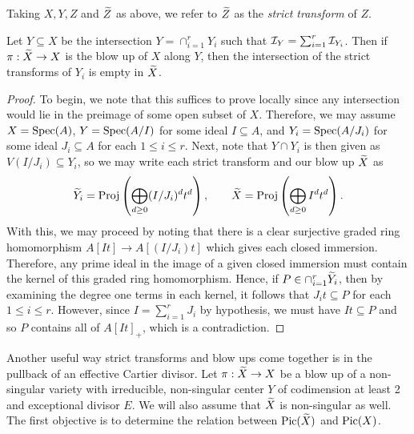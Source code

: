 \begin{definition}
    Taking $X, Y, Z$ and $\widetilde Z$ as above, we refer to  $\widetilde Z$ as the \textit{strict transform} of $Z$.
\end{definition}

\begin{proposition}
    Let $Y \subseteq X$ be the intersection $Y = \cap_{i = 1}^r Y_i$ such that $\mathcal{I}_Y = \sum_{i = 1}^r \mathcal{I}_{Y_i}$.
    Then if $\pi: \widetilde X \to X$ is the blow up of $X$ along $Y$,
    then the intersection of the strict transforms of $Y_i$ is empty in $\widetilde X$.
\end{proposition}

\begin{proof}
    To begin, we note that this suffices to prove locally since any intersection would lie in the preimage of some open subset of $X$.
    Therefore, we may assume $X = {\rm Spec}(A)$, $Y = {\rm Spec}(A / I)$ for some ideal $I \subseteq A$, and $Y_i = {\rm Spec}(A / J_i)$ for some ideal $J_i \subseteq A$ for each $1 \leq i \leq r$.
    Next, note that $Y \cap Y_i$ is then given as $V(I/J_i) \subseteq Y_i$,
    so we may write each strict transform and our blow up $\widetilde X$ as
    \[
        \widetilde Y_i = {\rm Proj}\left(
            \bigoplus_{d \geq 0} (I/J_i)^d t^d
        \right), \qquad
        \widetilde X = {\rm Proj}\left(
            \bigoplus_{d \geq 0} I^d t^d
        \right).
    \]
    With this, we may proceed by noting that there is a clear surjective graded ring homomorphism $A[It] \to A[(I/J_i) t]$ which gives each closed immersion.
    Therefore, any prime ideal in the image of a given closed immersion must contain the kernel of this graded ring homomorphism.
    Hence, if $P \in \cap_{i = 1}^r \widetilde Y_i$,
    then by examining the degree one terms in each kernel,
    it follows that $J_i t \subseteq P$ for each $1 \leq i \leq r$.
    However, since $I = \sum_{i = 1}^r J_i$ by hypothesis,
    we must have $I t \subseteq P$ and so $P$ contains all of $A[It]_+$,
    which is a contradiction.
\end{proof}

Another useful way strict transforms and blow ups come together is in the pullback of an effective Cartier divisor.
Let $\pi : \widetilde X \to X$ be a blow up of a non-singular variety with irreducible, non-singular center $Y$ of codimension at least 2 and exceptional divisor $E$.
We will also assume that $\widetilde X$ is non-singular as well.
The first objective is to determine the relation between ${\rm Pic}(\widetilde X)$ and ${\rm Pic}(X)$.

